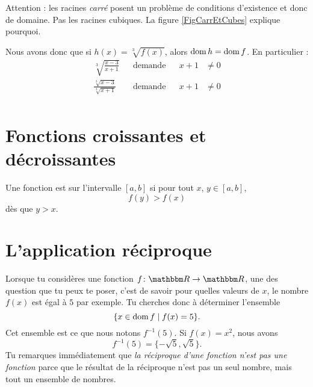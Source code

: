 Attention : les racines \emph{carré} posent un problème de conditions d'existence et donc de domaine. Pas les racines cubiques. La figure \ref{FigCarrEtCubes} explique pourquoi.

\newcommand{\CaptionFigCarrEtCubes}{En rouge, la fonction $x\mapsto x^2$. Comme tu le vois, seuls les réels positifs sont atteints, donc il n'est pas possible de chercher un réel dont le carré vaut $-2$ par exemple; par conséquent $\sqrt{-2}$ n'existe pas. En cyan, la fonction $x\mapsto x^3$. Cette fois, tous les réels sont atteints. Tu vois qu'il existe un réel dont le cube vaut $-2$ (c'est environ $-1.26$), et donc $\sqrt[3]{-2}$ existe.}


Nous avons donc que si $h(x)=\sqrt[3]{f(x)}$, alors $\operatorname{dom} h=\operatorname{dom} f$. En particulier :
\begin{align}
\sqrt[3]{\frac{ x-3 }{ x+1 }}		&&\text{demande}	&&x+1&\neq 0\\
\frac{ \sqrt[3]{x-3} }{ \sqrt[3]{x+1} }	&&\text{demande}	&&x+1&\neq 0\\
\end{align}

					\section{Fonctions croissantes et décroissantes}

Une fonction est  sur l'intervalle $[a,b]$ si pour tout $x$, $y\in [a,b]$, 
\begin{equation}
	f(y)>f(x)
\end{equation}
dès que $y>x$.

\section{L'application réciproque}

Lorsque tu considères une fonction $f\colon \eR\to \eR$, une des question que tu peux te poser, c'est de savoir pour quelles valeurs de $x$, le nombre $f(x)$ est égal à $5$ par exemple. Tu cherches donc à déterminer l'ensemble
\[ 
  \{ x\in\operatorname{dom} f\mid f(x)=5 \}.
\]
Cet ensemble est ce que nous notons $f^{-1}(5)$. Si $f(x)=x^2$, nous avons 
\[ 
f^{-1}(5)=\{ -\sqrt{5},\sqrt{5} \}.
\]
 Tu remarques immédiatement que \emph{la réciproque d'une fonction n'est pas une fonction} parce que le résultat de la réciproque n'est pas un seul nombre, mais tout un ensemble de nombres.

